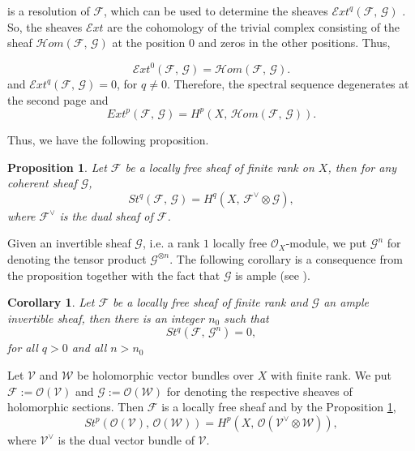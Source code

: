 \documentclass[xypic,amscd,syntonly,amssymb,verbatim,12pt]{amsart}
\theoremstyle{plain}
\newtheorem{Prop}[Thm]{Proposition}
\newtheorem{Cor}[Thm]{Corollary}
\theoremstyle{definition}
\theoremstyle{remark}
\numberwithin{equation}{section}
\begin{document}
is a resolution  of ${\mathcal F}$,
 which can be used to determine the sheaves  ${\mathcal Ext}^q({\mathcal F},\,{\mathcal G})$
  \cite[Proposition 6.5, page 234]{Hart}. So, the sheaves ${\mathcal Ext}$ are the cohomology of the trivial complex consisting of the sheaf ${\mathcal Hom}({\mathcal F},\,{\mathcal G})$ at the position $0$ and zeros in the other positions. Thus,
 
$${\mathcal Ext}^0({\mathcal F},\,{\mathcal G})= {\mathcal Hom}({\mathcal F},\,{\mathcal G}).$$
and ${\mathcal Ext}^q({\mathcal F},\,{\mathcal G})=0$, for $q\ne 0$. Therefore, the spectral sequence
 degenerates at the second page and
$$Ext^p({\mathcal F},\,{\mathcal G})=H^p(X,\, {\mathcal Hom}({\mathcal F},\,{\mathcal G})).$$
 
 Thus, we have the following proposition.

\begin{Prop}\label{locallyfree}
Let ${\mathcal F}$ be a locally free sheaf of finite rank on $X$, then for any coherent sheaf ${\mathcal G}$,
$$St^q({\mathcal F},\,{\mathcal G})=H^q(X,\,{\mathcal F}^{\vee}\otimes {\mathcal G}),$$
where ${\mathcal F}^{\vee}$ is the dual sheaf of ${\mathcal F}$.
\end{Prop}
 Given an invertible sheaf ${\mathcal G}$, i.e. a rank $1$ locally free ${\mathcal
 O}_X$-module, we put ${\mathcal G}^n$ for denoting the tensor
 product ${\mathcal G}^{\otimes n}$. The following corollary is a consequence from the proposition together
  with the fact that ${\mathcal G}$ is ample (see  \cite[Proposition 5.3, page
  229]{Hart}).
\begin{Cor}\label{CorAmple}
Let ${\mathcal F}$ be a locally free sheaf of finite rank and
${\mathcal G}$ an ample invertible sheaf, then there is an integer
$n_0$ such that
$$St^q({\mathcal F},\,{\mathcal G}^n)=0,$$
for all $q>0$ and all $n>n_0$
\end{Cor}

 

Let ${\mathcal V}$ and  ${\mathcal W}$  be holomorphic vector bundles over $X$ with finite rank.  We put ${\mathcal F}:={\mathcal O}(\mathcal V)$ and
 ${\mathcal G}:={\mathcal O}(\mathcal W)$ for denoting the respective sheaves of holomorphic sections. Then  ${\mathcal F}$ is a locally free sheaf and by the Proposition \ref{locallyfree},
 $$St^p({\mathcal O}({\mathcal V}),\,{\mathcal O}({\mathcal W}))=H^p(X,\, {\mathcal O}({\mathcal V}^{\vee}\otimes {\mathcal W})),$$
 where ${\mathcal V}^{\vee}$ is the dual vector bundle of ${\mathcal V}$.
\end{document}
